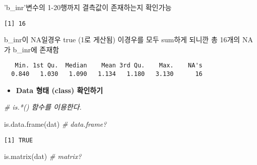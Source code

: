 \documentclass[
]{article}
\newenvironment{Shaded}{\begin{snugshade}}{\end{snugshade}}
\newcommand{\CommentTok}[1]{\textcolor[rgb]{0.56,0.35,0.01}{\textit{#1}}}
\newcommand{\FunctionTok}[1]{\textcolor[rgb]{0.00,0.00,0.00}{#1}}
\newcommand{\NormalTok}[1]{#1}
\newcommand{\SpecialCharTok}[1]{\textcolor[rgb]{0.00,0.00,0.00}{#1}}
\providecommand{\tightlist}{%
  \setlength{\itemsep}{0pt}\setlength{\parskip}{0pt}}
\begin{document}
'b\_inr'변수의 1-20행까지 결측값이 존재하는지 확인가능

\begin{Shaded}
\end{Shaded}

\begin{verbatim}
[1] 16
\end{verbatim}

b\_inr이 NA일경우 true (1로 게산됨) 이경우를 모두 sum하게 되니깐 총
16개의 NA가 b\_inr에 존재함

\begin{Shaded}
\end{Shaded}

\begin{verbatim}
   Min. 1st Qu.  Median    Mean 3rd Qu.    Max.    NA's 
  0.840   1.030   1.090   1.134   1.180   3.130      16 
\end{verbatim}

\begin{itemize}
\tightlist
\item
  \textbf{Data 형태 (class) 확인하기}
\end{itemize}

\begin{Shaded}
\begin{Highlighting}[]
\CommentTok{\# is.*() 함수를 이용한다.}

\FunctionTok{is.data.frame}\NormalTok{(dat)  }\CommentTok{\# data.frame?}
\end{Highlighting}
\end{Shaded}

\begin{verbatim}
[1] TRUE
\end{verbatim}

\begin{Shaded}
\begin{Highlighting}[]
\FunctionTok{is.matrix}\NormalTok{(dat)  }\CommentTok{\# matrix?}
\end{Highlighting}
\end{Shaded}
\end{document}
